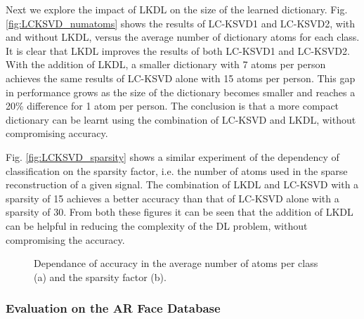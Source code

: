\documentclass[journal]{IEEEtran}
\begin{document}
Next we explore the impact of LKDL on the size of the learned dictionary. Fig. \ref{fig:LCKSVD_numatoms} shows the results of LC-KSVD1 and LC-KSVD2, with and without LKDL, versus the average number of dictionary atoms for each class. It is clear that LKDL improves the results of both LC-KSVD1 and LC-KSVD2. With the addition of LKDL, a smaller dictionary with 7 atoms per person achieves the same results of LC-KSVD alone with 15 atoms per person. This gap in performance grows as the size of the dictionary becomes smaller and reaches a 20\% difference for 1 atom per person. The conclusion is that a more compact dictionary can be learnt using the combination of LC-KSVD and LKDL, without compromising accuracy.

Fig. \ref{fig:LCKSVD_sparsity} shows a similar experiment of the dependency of classification on the sparsity factor, i.e. the number of atoms used in the sparse reconstruction of a given signal. The combination of LKDL and LC-KSVD with a sparsity of 15 achieves a better accuracy than that of LC-KSVD alone with a sparsity of 30. From both these figures it can be seen that the addition of LKDL can be helpful in reducing the complexity of the DL problem, without compromising the accuracy.

\begin{figure*}[!t]
\centering
{}
\hfil
{}
\caption{Dependance of accuracy in the average number of atoms per class (a) and the sparsity factor (b).}
\label{fig:GRAPH_5}
\end{figure*}

\subsubsection{Evaluation on the AR Face Database}
\end{document}
